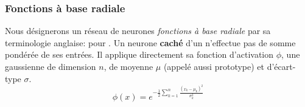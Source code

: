 \subsubsection{Fonctions à base radiale}
Nous désignerons un réseau de neurones \emph{fonctions à base radiale} par sa terminologie anglaise: \rbf pour .
\newcommand{\factnorm}{\sum_{r=1}^{m}x_{r}}
Un neurone \textbf{caché} d'un \rbf n'effectue pas de somme pondérée de ses entrées.
Il applique directement sa fonction d'activation $\phi$, une gaussienne de dimension $n$, de moyenne $\mu$ (appelé aussi prototype) et d'écart-type $\sigma$.
\[\phi(x) = e^{-\frac{1}{2}\sum_{k=1}^{n}\frac{(x_k-\mu_{k})^2}{\sigma_{k}^{2}}} \]%

